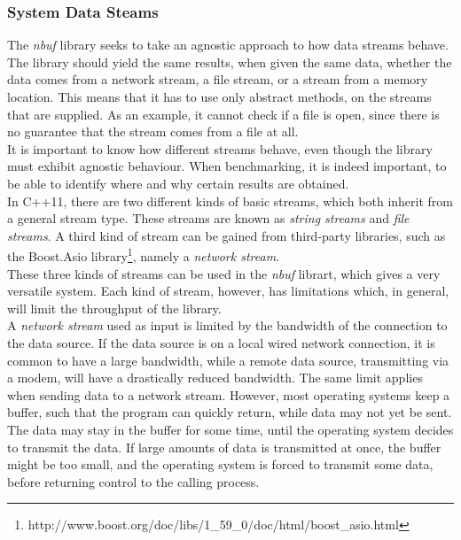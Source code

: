 \documentclass[a4paper]{article}
\newcommand{\nbuf}{\textit{nbuf} }
\begin{document}
\subsubsection{System Data Steams}
The \nbuf library seeks to take an agnostic approach to how data streams behave. The library should yield the same results, when given the same data, whether the data comes from a network stream, a file stream, or a stream from a memory location. This means that it has to use only abstract methods, on the streams that are supplied. As an example, it cannot check if a file is open, since there is no guarantee that the stream comes from a file at all.\\

It is important to know how different streams behave, even though the library must exhibit agnostic behaviour. When benchmarking, it is indeed important, to be able to identify where and why certain results are obtained.\\

In C++11, there are two different kinds of basic streams, which both inherit from a general stream type. These streams are known as \textit{string streams} and \textit{file streams}. A third kind of stream can be gained from third-party libraries, such as the Boost.Asio library\footnote{ http://www.boost.org/doc/libs/1\_59\_0/doc/html/boost\_asio.html}, namely a \textit{network stream}.\\

These three kinds of streams can be used in the \nbuf librart, which gives a very versatile system. Each kind of stream, however, has limitations which, in general, will limit the throughput of the library.\\

A \textit{network stream} used as input is limited by the bandwidth of the connection to the data source. If the data source is on a local wired network connection, it is common to have a large bandwidth, while a remote data source, transmitting via a modem, will have a drastically reduced bandwidth. The same limit applies when sending data to a network stream. However, most operating systems keep a buffer, such that the program can quickly return, while data may not yet be sent. The data may stay in the buffer for some time, until the operating system decides to transmit the data. If large amounts of data is transmitted at once, the buffer might be too small, and the operating system is forced to transmit some data, before returning control to the calling process.\\
\end{document}

